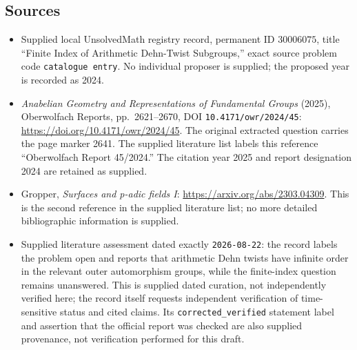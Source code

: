 \documentclass[11pt]{article}
\begin{document}
\subsection{Sources}
\begin{itemize}
\item Supplied local UnsolvedMath registry record, permanent ID \(30006075\), title ``Finite Index of Arithmetic Dehn-Twist Subgroups,'' exact source problem code \texttt{catalogue entry}. No individual proposer is supplied; the proposed year is recorded as 2024.
\item \emph{Anabelian Geometry and Representations of Fundamental Groups} (2025), Oberwolfach Reports, pp.\ 2621--2670, DOI \texttt{10.4171/owr/2024/45}: \url{https://doi.org/10.4171/owr/2024/45}. The original extracted question carries the page marker 2641. The supplied literature list labels this reference ``Oberwolfach Report 45/2024.'' The citation year 2025 and report designation 2024 are retained as supplied.
\item Gropper, \emph{Surfaces and p-adic fields I}: \url{https://arxiv.org/abs/2303.04309}. This is the second reference in the supplied literature list; no more detailed bibliographic information is supplied.
\item Supplied literature assessment dated exactly \texttt{2026-08-22}: the record labels the problem open and reports that arithmetic Dehn twists have infinite order in the relevant outer automorphism groups, while the finite-index question remains unanswered. This is supplied dated curation, not independently verified here; the record itself requests independent verification of time-sensitive status and cited claims. Its \texttt{corrected\_verified} statement label and assertion that the official report was checked are also supplied provenance, not verification performed for this draft.
\end{itemize}
\end{document}
